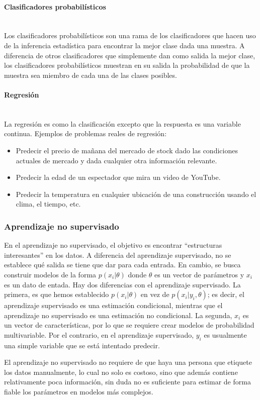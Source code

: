 	\paragraph{Clasificadores probabilísticos} ~\\

		Los clasificadores probabilísticos son una rama de los clasificadores que hacen uso de la inferencia estadística para encontrar la mejor clase dada una muestra. A diferencia de otros clasificadores que simplemente dan como salida la mejor clase, los clasificadores probabilísticos muestran en su salida la probabilidad de que la muestra sea miembro de cada una de las clases posibles.


	\paragraph{Regresión} ~\\
	
		La regresión es como la clasificación excepto que la respuesta es una variable continua. Ejemplos de problemas reales de regresión:
		\begin{itemize}
			\item Predecir el precio de mañana del mercado de stock dado las condiciones actuales de mercado y dada cualquier otra información relevante.
			\item Predecir la edad de un espectador que mira un video de YouTube.
			\item Predecir la temperatura en cualquier ubicación de una construcción usando el clima, el tiempo, etc.
		\end{itemize}
	
	
	\subsubsection{Aprendizaje no supervisado}

		En el aprendizaje no supervisado, el objetivo es encontrar ``estructuras interesantes'' en los datos. A diferencia del aprendizaje supervisado, no se establece qué salida se tiene que dar para cada entrada. En cambio, se busca construir modelos de la forma $p(x_i | \theta)$ donde $\theta$ es un vector de parámetros y $x_i$ es un dato de entada. Hay dos diferencias con el aprendizaje supervisado. La primera, es que hemos establecido $p(x_i | \theta)$ en vez de $p(x_i | y_i, \theta)$; es decir, el aprendizaje supervisado es una estimación condicional, mientras que el aprendizaje no supervisado es una estimación no condicional. La segunda, $x_i$ es un vector de características, por lo que se requiere crear modelos de probabilidad multivariable. Por el contrario, en el aprendizaje supervisado, $y_i$ es usualmente una simple variable que se está intentado predecir.
		
		El aprendizaje no supervisado no requiere de que haya una persona que etiquete los datos manualmente, lo cual no solo es costoso, sino que además contiene relativamente poca información, sin duda no es suficiente para estimar de forma fiable los parámetros en modelos más complejos.